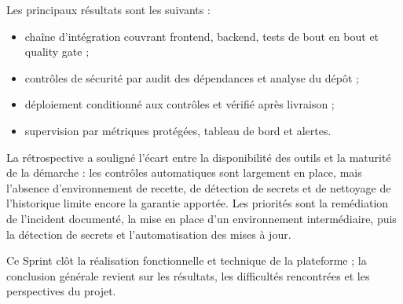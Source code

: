Les principaux résultats sont les suivants :

\begin{itemize}[nosep,leftmargin=1.2em]
    \item chaîne d'intégration couvrant frontend, backend, tests de bout en bout et quality gate ;
    \item contrôles de sécurité par audit des dépendances et analyse du dépôt ;
    \item déploiement conditionné aux contrôles et vérifié après livraison ;
    \item supervision par métriques protégées, tableau de bord et alertes.
\end{itemize}

La rétrospective a souligné l'écart entre la disponibilité des outils et la maturité de la démarche : les contrôles automatiques sont largement en place, mais l'absence d'environnement de recette, de détection de secrets et de nettoyage de l'historique limite encore la garantie apportée. Les priorités sont la remédiation de l'incident documenté, la mise en place d'un environnement intermédiaire, puis la détection de secrets et l'automatisation des mises à jour.

Ce Sprint clôt la réalisation fonctionnelle et technique de la plateforme ; la conclusion générale revient sur les résultats, les difficultés rencontrées et les perspectives du projet.
